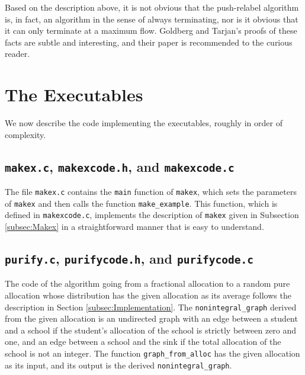 \documentclass[12pt]{article}
\theoremstyle{definition}
\begin{document}
\begin{appendix}
Based on the description above, it is not obvious that the
push-relabel algorithm is, in fact, an algorithm in the sense of
always terminating, nor is it obvious that it can only terminate at a
maximum flow.  Goldberg and Tarjan's proofs of these facts are subtle
and interesting, and their paper is recommended to the curious reader.

\section{The Executables}

We now describe the code implementing the executables, roughly in
order of complexity.

\subsection{\texttt{makex.c}, \texttt{makexcode.h},  and \texttt{makexcode.c}}

The file \texttt{makex.c} contains the \texttt{main} function of
\texttt{makex}, which sets the parameters of \texttt{makex} and then
calls the function \texttt{make\_example}.  This function, which is
defined in \texttt{makexcode.c}, implements the description of
\texttt{makex} given in Subsection \ref{subsec:Makex} in a
straightforward manner that is easy to understand.

\subsection{\texttt{purify.c}, \texttt{purifycode.h}, and \texttt{purifycode.c}}

The code of the algorithm going from a fractional allocation to a
random pure allocation whose distribution has the given allocation as
its average follows the description in Section
\ref{subsec:Implementation}.  The \texttt{nonintegral\_graph} derived
from the given allocation is an undirected graph with an edge between
a student and a school if the student's allocation of the school is
strictly between zero and one, and an edge between a school and the
sink if the total allocation of the school is not an integer.  The
function \texttt{graph\_from\_alloc} has the given allocation as its
input, and its output is the derived \texttt{nonintegral\_graph}.


\end{appendix}
\end{document}
